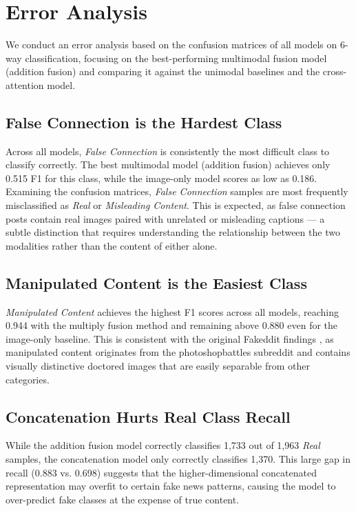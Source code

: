 \section{Error Analysis}

We conduct an error analysis based on the confusion matrices of all models on 6-way classification, focusing on the best-performing multimodal fusion model (addition fusion) and comparing it against the unimodal baselines and the cross-attention model.

\subsection{False Connection is the Hardest Class}

Across all models, \textit{False Connection} is consistently the most difficult class to classify correctly. The best multimodal model (addition fusion) achieves only 0.515 F1 for this class, while the image-only model scores as low as 0.186. Examining the confusion matrices, \textit{False Connection} samples are most frequently misclassified as \textit{Real} or \textit{Misleading Content}. This is expected, as false connection posts contain real images paired with unrelated or misleading captions — a subtle distinction that requires understanding the relationship between the two modalities rather than the content of either alone.

\subsection{Manipulated Content is the Easiest Class}

\textit{Manipulated Content} achieves the highest F1 scores across all models, reaching 0.944 with the multiply fusion method and remaining above 0.880 even for the image-only baseline. This is consistent with the original Fakeddit findings \cite{nakamura2020fakeddit}, as manipulated content originates from the photoshopbattles subreddit and contains visually distinctive doctored images that are easily separable from other categories.

\subsection{Concatenation Hurts Real Class Recall}

While the addition fusion model correctly classifies 1,733 out of 1,963 \textit{Real} samples, the concatenation model only correctly classifies 1,370. This large gap in recall (0.883 vs. 0.698) suggests that the higher-dimensional concatenated representation may overfit to certain fake news patterns, causing the model to over-predict fake classes at the expense of true content.

